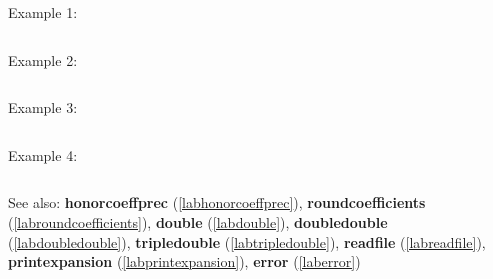 \noindent Example 1: 
\begin{center}\begin{minipage}{15cm}\begin{Verbatim}[frame=single]
\end{Verbatim}
\end{minipage}\end{center}
\noindent Example 2: 
\begin{center}\begin{minipage}{15cm}\begin{Verbatim}[frame=single]
\end{Verbatim}
\end{minipage}\end{center}
\noindent Example 3: 
\begin{center}\begin{minipage}{15cm}\begin{Verbatim}[frame=single]
\end{Verbatim}
\end{minipage}\end{center}
\noindent Example 4: 
\begin{center}\begin{minipage}{15cm}\begin{Verbatim}[frame=single]
\end{Verbatim}
\end{minipage}\end{center}
See also: \textbf{honorcoeffprec} (\ref{labhonorcoeffprec}), \textbf{roundcoefficients} (\ref{labroundcoefficients}), \textbf{double} (\ref{labdouble}), \textbf{doubledouble} (\ref{labdoubledouble}), \textbf{tripledouble} (\ref{labtripledouble}), \textbf{readfile} (\ref{labreadfile}), \textbf{printexpansion} (\ref{labprintexpansion}), \textbf{error} (\ref{laberror})

